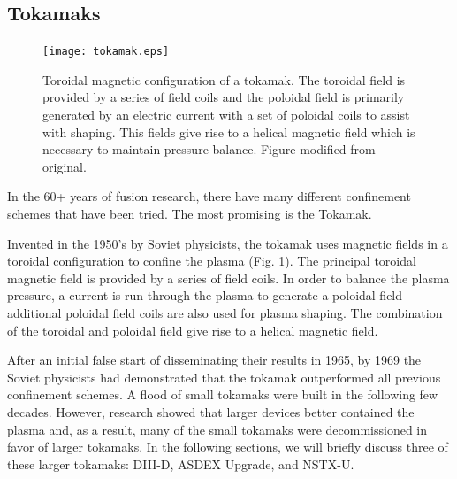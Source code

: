 \subsection{Tokamaks}
\begin{figure}[ht]
    \centering
    \texttt{[image: tokamak.eps]}
    \caption{Toroidal magnetic configuration of a tokamak. The toroidal field is provided by a series of field coils and the poloidal field is primarily generated by an electric current with a set of poloidal coils to assist with shaping. This fields give rise to a helical magnetic field which is necessary to maintain pressure balance. Figure modified from original\cite{geiger2013thesis}.}
    \label{fig:tokamak}
\end{figure}
In the 60+ years of fusion research, there have many different confinement schemes that have been tried. The most promising is the Tokamak.

Invented in the 1950's by Soviet physicists, the tokamak uses magnetic fields in a toroidal configuration to confine the plasma (Fig. \ref{fig:tokamak}). The principal toroidal magnetic field is provided by a series of field coils. In order to balance the plasma pressure, a current is run through the plasma to generate a poloidal field---additional poloidal field coils are also used for plasma shaping. The combination of the toroidal and poloidal field give rise to a helical magnetic field.

After an initial false start of disseminating their results in 1965, by 1969 the Soviet physicists had demonstrated that the tokamak outperformed all previous confinement schemes. A flood of small tokamaks were built in the following few decades. However, research showed that larger devices better contained the plasma and, as a result, many of the small tokamaks were decommissioned in favor of larger tokamaks. In the following sections, we will briefly discuss three of these larger tokamaks: DIII-D, ASDEX Upgrade, and NSTX-U.

